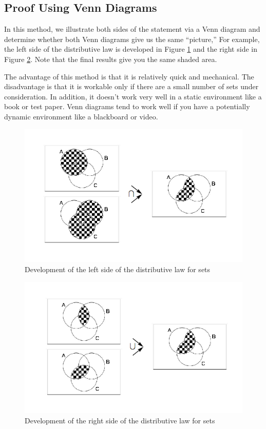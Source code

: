 \documentclass[10pt,]{book}
\theoremstyle{plain}
\theoremstyle{definition}
\theoremstyle{definition}
\theoremstyle{definition}
\begin{document}
\subsection[Proof Using Venn Diagrams]{Proof Using Venn Diagrams}\label{ss-venn-proofs}
In this method, we illustrate both sides of the statement via a Venn diagram and determine whether both Venn diagrams give us the same ``picture,'' For example, the left side of the distributive law is developed in Figure \hyperref[distrib-venn-lhs]{\ref{distrib-venn-lhs}} and the right side in Figure \hyperref[distrib-venn-rhs]{\ref{distrib-venn-rhs}}. Note that the final results give you the same shaded area.%
\par
The advantage of this method is that it is relatively quick and mechanical. The disadvantage is that it is workable only if there are a small number of sets under consideration. In addition, it doesn't work very well in a static environment like a book or test paper.  Venn diagrams tend to work well if you have a potentially dynamic environment like a blackboard or video. 
%
\leavevmode%
\begin{figure}
\centering
\includegraphics[width=1\linewidth]{images/distrib-venn-lhs.png}
\caption{Development of the left side of the distributive law for sets
			 \label{distrib-venn-lhs}}
\end{figure}
\leavevmode%
\begin{figure}
\centering
\includegraphics[width=1\linewidth]{images/distrib-venn-rhs.png}
\caption{Development of the right side of the distributive law for sets
			 \label{distrib-venn-rhs}}
\end{figure}
\end{document}
